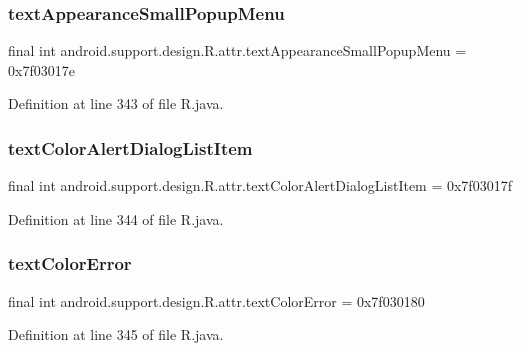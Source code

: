 \subsubsection{\texorpdfstring{textAppearanceSmallPopupMenu}{textAppearanceSmallPopupMenu}}
{\footnotesize\ttfamily final int android.\+support.\+design.\+R.\+attr.\+text\+Appearance\+Small\+Popup\+Menu = 0x7f03017e\hspace{0.3cm}{\ttfamily [static]}}



Definition at line 343 of file R.\+java.

\mbox{\label{classandroid_1_1support_1_1design_1_1_r_1_1attr_a662d370f1b26a96ef3a6cfb38fd88262}} 
\subsubsection{\texorpdfstring{textColorAlertDialogListItem}{textColorAlertDialogListItem}}
{\footnotesize\ttfamily final int android.\+support.\+design.\+R.\+attr.\+text\+Color\+Alert\+Dialog\+List\+Item = 0x7f03017f\hspace{0.3cm}{\ttfamily [static]}}



Definition at line 344 of file R.\+java.

\mbox{\label{classandroid_1_1support_1_1design_1_1_r_1_1attr_a7e86019393a4c821c9ad53322dab2114}} 
\subsubsection{\texorpdfstring{textColorError}{textColorError}}
{\footnotesize\ttfamily final int android.\+support.\+design.\+R.\+attr.\+text\+Color\+Error = 0x7f030180\hspace{0.3cm}{\ttfamily [static]}}



Definition at line 345 of file R.\+java.

